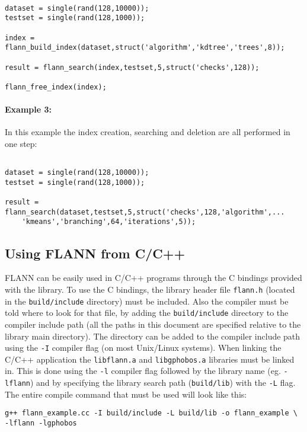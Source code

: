 \documentclass[letter,10pt]{article}
\begin{document}
\begin{Verbatim}[fontsize=\footnotesize,frame=single]

dataset = single(rand(128,10000));
testset = single(rand(128,1000));

index = flann_build_index(dataset,struct('algorithm','kdtree','trees',8));

result = flann_search(index,testset,5,struct('checks',128));

flann_free_index(index);

\end{Verbatim}

\paragraph{Example 3:}

In this example the index creation, searching and deletion are all performed in one step:

\begin{Verbatim}[fontsize=\footnotesize,frame=single]

dataset = single(rand(128,10000));
testset = single(rand(128,1000));

result = flann_search(dataset,testset,5,struct('checks',128,'algorithm',...
    'kmeans','branching',64,'iterations',5));

\end{Verbatim}

\subsection{Using FLANN from C/C++}

FLANN can be easily used in C/C++ programs through the C bindings provided
with the library. To use the C bindings, the library header file
\texttt{flann.h} (located in the \texttt{build/include} directory) must be
included. Also the compiler must be told where to look for that file, by
adding the \texttt{build/include} directory to the compiler include path
(all the paths in this document are specified relative to the library main
directory). The directory can be added to the compiler include
path using the \texttt{-I} compiler flag (on most Unix/Linux systems). When
linking the C/C++ application the \texttt{libflann.a} and
\texttt{libgphobos.a} libraries must be linked in. This is done using the
\texttt{-l} compiler flag followed by the library name
(eg. \texttt{-lflann}) and by specifying the library search path
(\texttt{build/lib}) with the \texttt{-L} flag. The entire compile command
that must be used will look like this:
\begin{Verbatim}[fontsize=\footnotesize]
g++ flann_example.cc -I build/include -L build/lib -o flann_example \
-lflann -lgphobos
\end{Verbatim}
\end{document}
